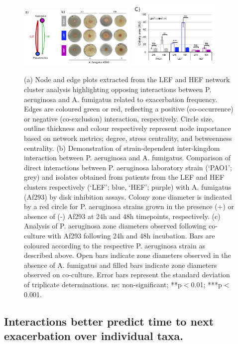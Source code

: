 \begin{figure}[!htb]
	\centering
	\includegraphics[width=0.5\textwidth]{image/exp_validation1.png}%
	\includegraphics[width=0.4\textwidth]{image/exp_validation2.png}
	\caption{(a) Node and edge plots extracted from the LEF and HEF network cluster analysis highlighting opposing interactions between P. aeruginosa and A. fumigatus related to exacerbation frequency. Edges are coloured green or red, reflecting a positive (co-occurrence) or negative (co-exclusion) interaction, respectively. Circle size, outline thickness and colour respectively represent node importance based on network metrics; degree, stress centrality, and betweenness centrality. (b) Demonstration of strain-dependent inter-kingdom interaction between P. aeruginosa and A. fumigatus. Comparison of direct interactions between P. aeruginosa laboratory strain (‘PAO1’; grey) and isolates obtained from patients from the LEF and HEF clusters respectively (‘LEF’; blue, ‘HEF’; purple) with A. fumigatus (Af293) by disk inhibition assays. Colony zone diameter is indicated by a red circle for P. aeruginosa strains grown in the presence (+) or absence of (-) Af293 at 24h and 48h timepoints, respectively. (c) Analysis of P. aeruginosa zone diameters observed following co-culture with Af293 following 24h and 48h incubation. Bars are coloured according to the respective P. aeruginosa strain as described above. Open bars indicate zone diameters observed in the absence of A. fumigatus and filled bars indicate zone diameters observed on co-culture. Error bars represent the standard deviation of triplicate determinations. ns: non-significant; **p$<$0.01; ***p$<$0.001.}
	\label{fig7}
\end{figure}

\subsection{Interactions better predict time to next exacerbation over individual taxa.}

